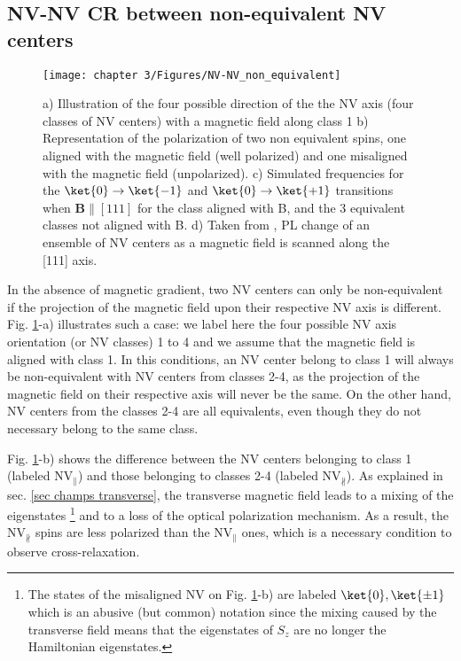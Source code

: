 \documentclass[a4paper, 11pt]{report}
\begin{document}
\subsection{NV-NV CR between non-equivalent NV centers}
\label{non_equi_valent_CR}
\begin{figure}[h]
\centering
\texttt{[image: chapter 3/Figures/NV-NV\_non\_equivalent]}
\caption{a) Illustration of the four possible direction of the the NV axis (four classes of NV centers) with a magnetic field along class 1 b) Representation of the polarization of two non equivalent spins, one aligned with the magnetic field (well polarized) and one misaligned with the magnetic field (unpolarized). c) Simulated frequencies for the $\ket{0} \to \ket{-1}$ and $\ket{0} \to \ket{+1}$ transitions when $\mathbf{B}\parallel [111]$ for the class aligned with B, and the 3 equivalent classes not aligned with B. d) Taken from \citep{armstrong2010nv}, PL change of an ensemble of NV centers as a magnetic field is scanned along the [111] axis.}
\label{non-equivalent NV-NV}
\end{figure}

In the absence of magnetic gradient, two NV centers can only be non-equivalent if the projection of the magnetic field upon their respective NV axis is different. Fig. \ref{non-equivalent NV-NV}-a) illustrates such a case: we label here the four possible NV axis orientation (or NV classes) 1 to 4 and we assume that the magnetic field is aligned with class 1. In this conditions, an NV center belong to class 1 will always be non-equivalent with NV centers from classes 2-4, as the projection of the magnetic field on their respective axis will never be the same. On the other hand, NV centers from the classes 2-4 are all equivalents, even though they do not necessary belong to the same class.

Fig. \ref{non-equivalent NV-NV}-b) shows the difference between the NV centers belonging to class 1 (labeled NV$_\parallel$) and those belonging to classes 2-4 (labeled NV$_\nparallel$). As explained in sec. \ref{sec champs transverse}, the transverse magnetic field leads to a mixing of the eigenstates \footnote{The states of the misaligned NV on Fig. \ref{non-equivalent NV-NV}-b) are labeled $\ket{0},\ket{\pm 1}$ which is an abusive (but common) notation since the mixing caused by the transverse field means that the eigenstates of $S_z$ are no longer the Hamiltonian eigenstates.} and to a loss of the optical polarization mechanism. As a result, the NV$_\nparallel$ spins are less polarized than the NV$_\parallel$ ones, which is a necessary condition to observe cross-relaxation.
\end{document}
